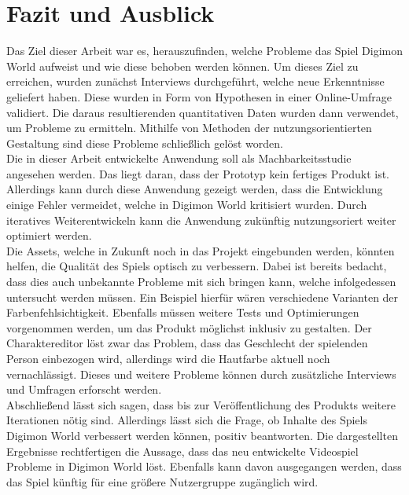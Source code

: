 \section{Fazit und Ausblick}\label{sec:conclusion}
Das Ziel dieser Arbeit war es, herauszufinden, welche Probleme das Spiel Digimon World aufweist und wie diese behoben werden können. Um dieses Ziel zu erreichen, wurden zunächst Interviews durchgeführt, welche neue Erkenntnisse geliefert haben. Diese wurden in Form von Hypothesen in einer Online-Umfrage validiert. Die daraus resultierenden quantitativen Daten wurden dann verwendet, um Probleme zu ermitteln. Mithilfe von Methoden der nutzungsorientierten Gestaltung sind diese Probleme schließlich gelöst worden.\\

Die in dieser Arbeit entwickelte Anwendung soll als Machbarkeitsstudie angesehen werden. Das liegt daran, dass der Prototyp kein fertiges Produkt ist. Allerdings kann durch diese Anwendung gezeigt werden, dass die Entwicklung einige Fehler vermeidet, welche in Digimon World kritisiert wurden. 
Durch iteratives Weiterentwickeln kann die Anwendung zukünftig nutzungsoriert weiter optimiert werden.\\

Die Assets, welche in Zukunft noch in das Projekt eingebunden werden, könnten helfen, die Qualität des Spiels optisch zu verbessern. Dabei ist bereits bedacht, dass dies auch unbekannte Probleme mit sich bringen kann, welche infolgedessen untersucht werden müssen. Ein Beispiel hierfür wären verschiedene Varianten der Farbenfehlsichtigkeit. Ebenfalls müssen weitere Tests und Optimierungen vorgenommen werden, um das Produkt möglichst inklusiv zu gestalten. Der Charaktereditor löst zwar das Problem, dass das Geschlecht der spielenden Person einbezogen wird, allerdings wird die Hautfarbe aktuell noch vernachlässigt. Dieses und weitere Probleme können durch zusätzliche Interviews und Umfragen erforscht werden.\\

Abschließend lässt sich sagen, dass bis zur Veröffentlichung des Produkts weitere Iterationen nötig sind. Allerdings lässt sich die Frage, ob Inhalte des Spiels Digimon World verbessert werden können, positiv beantworten. Die dargestellten Ergebnisse rechtfertigen die Aussage, dass das neu entwickelte Videospiel Probleme in Digimon World löst. Ebenfalls kann davon ausgegangen werden, dass das Spiel künftig für eine größere Nutzergruppe zugänglich wird.